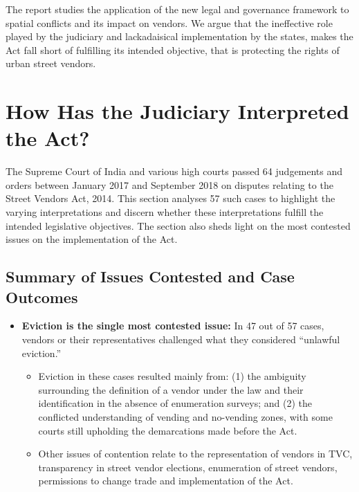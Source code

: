\documentclass[a4paper, 12pt, twoside]{article}
\begin{document}
{The report studies the application of the new legal and governance framework to spatial conflicts and its impact on vendors. We argue that the ineffective role played by the judiciary and lackadaisical implementation by the states, makes the Act fall short of fulfilling its intended objective, that is protecting the rights of urban street vendors.

\section*{How Has the Judiciary Interpreted the Act?}

The Supreme Court of India and various high courts passed 64 judgements and orders between January 2017 and September 2018 on disputes relating to the Street Vendors Act, 2014. This section analyses 57 such cases to highlight the varying interpretations and discern whether these interpretations fulfill the intended legislative objectives. The section also sheds light on the most contested issues on the implementation of the Act.

\subsection*{Summary of Issues Contested and Case Outcomes}

\begin{itemize}
\item \textbf{Eviction is the single most contested issue:} In 47 out of 57 cases, vendors or their representatives challenged what they considered “unlawful eviction.”

\begin{itemize}
\item Eviction in these cases resulted mainly from: (1) the ambiguity surrounding the definition of a vendor under the law and their identification in the absence of enumeration surveys; and (2) the conflicted understanding of vending and no-vending zones, with some courts still upholding the demarcations made before the Act.

\item Other issues of contention relate to the representation of vendors in TVC, transparency in street vendor elections, enumeration of street vendors, permissions to change trade and implementation of the Act.


\end{itemize}
\end{itemize}}
\end{document}
